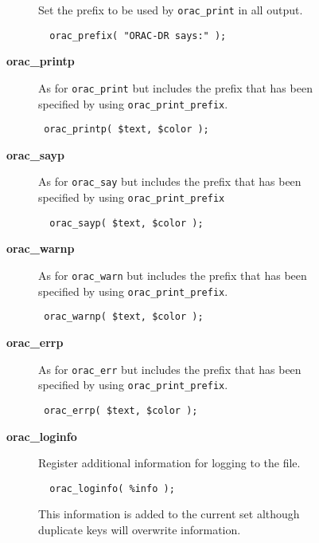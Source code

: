 \begin{description}
\begin{description}
\begin{description}
Set the prefix to be used by \texttt{orac\_print} in all output.

\begin{verbatim}
  orac_prefix( "ORAC-DR says:" );
\end{verbatim}

\item[{\textbf{orac\_printp}}] \mbox{}

As for \texttt{orac\_print} but includes the prefix that has been specified
by using \texttt{orac\_print\_prefix}.

\begin{verbatim}
 orac_printp( $text, $color );
\end{verbatim}

\item[{\textbf{orac\_sayp}}] \mbox{}

As for \texttt{orac\_say} but includes the prefix that has been specified by using \texttt{orac\_print\_prefix}

\begin{verbatim}
  orac_sayp( $text, $color );
\end{verbatim}

\item[{\textbf{orac\_warnp}}] \mbox{}

As for \texttt{orac\_warn} but includes the prefix that has been specified
by using \texttt{orac\_print\_prefix}.

\begin{verbatim}
 orac_warnp( $text, $color );
\end{verbatim}

\item[{\textbf{orac\_errp}}] \mbox{}

As for \texttt{orac\_err} but includes the prefix that has been specified
by using \texttt{orac\_print\_prefix}.

\begin{verbatim}
 orac_errp( $text, $color );
\end{verbatim}

\item[{\textbf{orac\_loginfo}}] \mbox{}

Register additional information for logging to the file.

\begin{verbatim}
  orac_loginfo( %info );
\end{verbatim}


This information is added to the current set although duplicate keys will
overwrite information.




\end{description}
\end{description}
\end{description}

